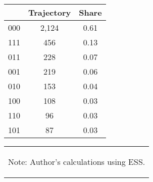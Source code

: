 \begin{table}
\centering
\caption{Frequencies of Trajectories of Households}
\label{tbl:Trajectories}
\begin{tabular}{lcc}
\toprule
{} &  Trajectory & Share \\
\midrule
000 &        2,124 &  0.61  \\
111 &         456 &  0.13  \\
011 &         228 &  0.07  \\
001 &         219 &  0.06  \\
010 &         153 &  0.04  \\
100 &         108 &  0.03  \\
110 &          96 &  0.03  \\
101 &          87 &  0.03  \\
\bottomrule
\end{tabular}
\vspace*{-2em}
\begin{table}[H]
    \centering
    \begin{tabular}{p{}} 
        \begin{tablenotes}
              \small
              \item Note: Author's calculations using ESS.
        \end{tablenotes}
    \end{tabular}
\end{table}    
\end{table}








